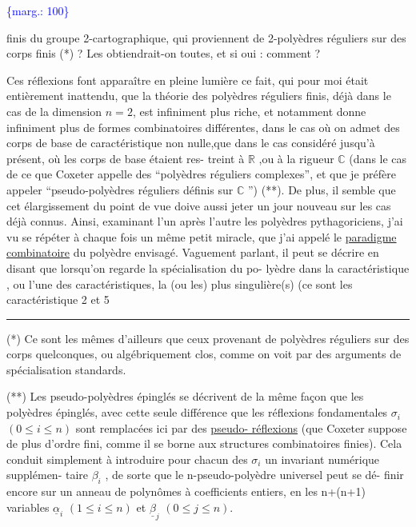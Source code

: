 \documentclass[11pt]{article}
\newcommand{\scanpage}[1]{\par\bigskip\noindent{\small\sffamily[scan #1]}\par}
\newcommand{\mspage}[1]{{\small\sffamily[p.\,#1]}}
\newcommand{\margin}[1]{\textcolor{blue}{\{\textsf{marg.:} #1\}}}
\newcommand{\uline}[1]{\underline{#1}}
\begin{document}
\margin{100}

\clearpage
\scanpage{119/101}
\mspage{23}

finis du groupe 2-cartographique, qui proviennent de 2-polyèdres
réguliers sur des corps finis (*) ? Les obtiendrait-on toutes,
et si oui : comment ?

Ces réflexions font apparaître en pleine lumière ce fait,
qui pour moi était entièrement inattendu, que la théorie des
polyèdres réguliers finis, déjà dans le cas de la dimension
$n = 2$, est infiniment plus riche, et notamment donne infiniment
plus de formes combinatoires différentes, dans le cas où on admet
des corps de base de caractéristique non nulle,\quad que dans le
cas considéré jusqu'à présent, où les corps de base étaient res-%
treint à $\mathbb{R}$ ,ou à la rigueur $\mathbb{C}$ (dans le cas de ce que Coxeter
appelle des ``polyèdres réguliers complexes'', et que je préfère
appeler ``pseudo-polyèdres réguliers définis sur $\mathbb{C}$ '') (**). De plus,
il semble que cet élargissement du point de vue doive aussi jeter
un jour nouveau sur les cas déjà connus. Ainsi, examinant l'un
après l'autre les polyèdres pythagoriciens, j'ai vu se répéter
à chaque fois un même petit miracle, que j'ai appelé le \uline{paradigme
combinatoire} du polyèdre envisagé. Vaguement parlant, il peut se
décrire en disant que lorsqu'on regarde la spécialisation du po-%
lyèdre dans la caractéristique , ou l'une des caractéristiques, la
(ou les) plus singulière(s) (ce sont les caractéristique 2 et 5

\rule{5cm}{0.4pt}

(*) Ce sont les mêmes d'ailleurs que ceux provenant de polyèdres
réguliers sur des corps quelconques, ou algébriquement clos, comme
on voit par des arguments de spécialisation standards.

(**) Les pseudo-polyèdres épinglés se décrivent de la même façon que
les polyèdres épinglés, avec cette seule différence que les réflexions
fondamentales $\sigma_i$ $(0 \leq i \leq n)$ sont remplacées ici par des \uline{pseudo-%
réflexions} (que Coxeter suppose de plus d'ordre fini, comme il se
borne aux structures combinatoires finies). Cela conduit simplement
à introduire pour chacun des $\sigma_i$ un invariant numérique supplémen-%
taire $\beta_i$ , de sorte que le n-pseudo-polyèdre universel peut se dé-%
finir encore sur un anneau de polynômes à coefficients entiers, en
les n+(n+1) variables $\underline{\alpha}_i$ $(1 \leq i \leq n)$ et $\underline{\beta}_j$ $(0 \leq j \leq n)$.
\end{document}
